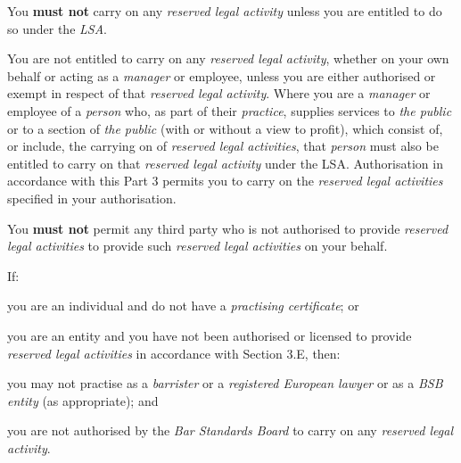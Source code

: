 
You \textcolor{myred}{\textbf{must not }}carry on any \emph{reserved legal activity} unless you are
entitled to do so under the \emph{LSA}.





You are not entitled to carry on any \emph{reserved legal activity},
whether on your own behalf or acting as a \emph{manager} or employee,
unless you are either authorised or exempt in respect of that
\emph{reserved legal activity}. Where you are a \emph{manager} or
employee of a \emph{person} who, as part of their \emph{practice},
supplies services to \emph{the public} or to a section of \emph{the
public} (with or without a view to profit), which consist of, or
include, the carrying on of \emph{reserved legal activities}, that
\emph{person} must also be entitled to carry on that \emph{reserved
legal activity} under the LSA. Authorisation in accordance with this
Part 3 permits you to carry on the \emph{reserved legal activities}
specified in your authorisation.




You \textcolor{myred}{\textbf{must not }}permit any third party who is not authorised to provide
\emph{reserved legal activities} to provide such \emph{reserved legal
activities} on your behalf.


If:
\nl\item you are an individual and do not have a \emph{practising
certificate}; or
\item you are an entity and you have not been authorised or licensed to
provide \emph{reserved legal activities} in accordance with Section 3.E,
then:
\al
\item you may not practise as a \emph{barrister} or a \emph{registered
European lawyer} or as a \emph{BSB entity} (as appropriate); and
\item you are not authorised by the \emph{Bar Standards Board} to carry on
any \emph{reserved legal activity}.\la
\ln
{}

